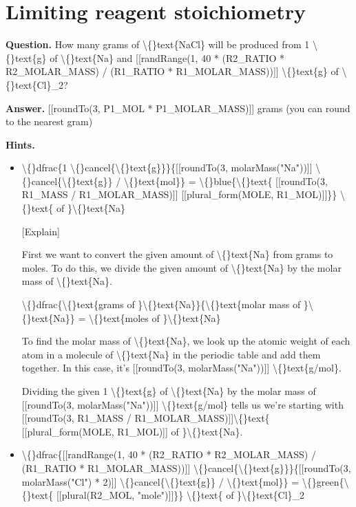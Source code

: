 \documentclass{article}
\begin{document}
\section*{Limiting reagent stoichiometry}
\textbf{Question.} How many grams of \textbackslash\{\}text\{NaCl\} will be produced from
        1 \textbackslash\{\}text\{g\} of \textbackslash\{\}text\{Na\} and
        [[randRange(1, 40 * (R2\_RATIO * R2\_MOLAR\_MASS) / (R1\_RATIO * R1\_MOLAR\_MASS))]] \textbackslash\{\}text\{g\} of \textbackslash\{\}text\{Cl\}\_2?

\textbf{Answer.} [[roundTo(3, P1\_MOL * P1\_MOLAR\_MASS)]] grams (you can round to the nearest gram)

\textbf{Hints.}
\begin{itemize}
  \item \textbackslash\{\}dfrac\{1 \textbackslash\{\}cancel\{\textbackslash\{\}text\{g\}\}\}\{[[roundTo(3, molarMass("Na"))]] \textbackslash\{\}cancel\{\textbackslash\{\}text\{g\}\} / \textbackslash\{\}text\{mol\}\} =
                \textbackslash\{\}blue\{\textbackslash\{\}text\{ [[roundTo(3, R1\_MASS / R1\_MOLAR\_MASS)]] [[plural\_form(MOLE, R1\_MOL)]]\}\} \textbackslash\{\}text\{ of \}\textbackslash\{\}text\{Na\}
            
            [Explain]
            
                
                    First we want to convert the given amount of \textbackslash\{\}text\{Na\} from grams to moles. To do this, we divide
                    the given amount of \textbackslash\{\}text\{Na\} by the molar mass of \textbackslash\{\}text\{Na\}.
                
                     \textbackslash\{\}dfrac\{\textbackslash\{\}text\{grams of \}\textbackslash\{\}text\{Na\}\}\{\textbackslash\{\}text\{molar mass of \}\textbackslash\{\}text\{Na\}\} = \textbackslash\{\}text\{moles of \}\textbackslash\{\}text\{Na\}
                
                    To find the molar mass of \textbackslash\{\}text\{Na\}, we look up the atomic weight of each atom in a molecule of
                    \textbackslash\{\}text\{Na\} in the periodic table and add them together.
                    In this case, it's [[roundTo(3, molarMass("Na"))]] \textbackslash\{\}text\{g/mol\}.
                
                    Dividing the given 1 \textbackslash\{\}text\{g\} of \textbackslash\{\}text\{Na\} by the molar mass of
                    [[roundTo(3, molarMass("Na"))]] \textbackslash\{\}text\{g/mol\} tells us we're starting with
                    [[roundTo(3, R1\_MASS / R1\_MOLAR\_MASS)]]\textbackslash\{\}text\{ [[plural\_form(MOLE, R1\_MOL)]] of \}\textbackslash\{\}text\{Na\}.
  \item \textbackslash\{\}dfrac\{[[randRange(1, 40 * (R2\_RATIO * R2\_MOLAR\_MASS) / (R1\_RATIO * R1\_MOLAR\_MASS))]] \textbackslash\{\}cancel\{\textbackslash\{\}text\{g\}\}\}\{[[roundTo(3, molarMass("Cl") * 2)]] \textbackslash\{\}cancel\{\textbackslash\{\}text\{g\}\} / \textbackslash\{\}text\{mol\}\} =
                \textbackslash\{\}green\{\textbackslash\{\}text\{ [[plural(R2\_MOL, "mole")]]\}\} \textbackslash\{\}text\{ of \}\textbackslash\{\}text\{Cl\}\_2
            

\end{itemize}
\end{document}
